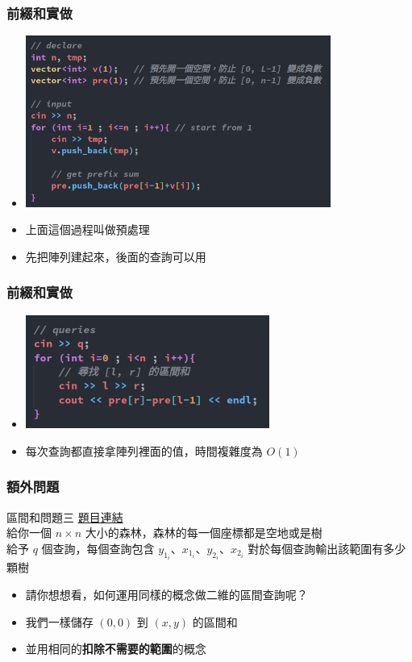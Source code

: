 \documentclass{beamer}
\begin{document}
\begin{frame}
    \frametitle{前綴和實做}
    \begin{itemize}
        \item \includegraphics[width=10.0cm]{img/img_9.png}
        \item 上面這個過程叫做預處理
        \item 先把陣列建起來，後面的查詢可以用
    \end{itemize}
\end{frame}

\begin{frame}
    \frametitle{前綴和實做}
    \begin{itemize}
        \item \includegraphics[width=8.0cm]{img/img_10.png}
        \item 每次查詢都直接拿陣列裡面的值，時間複雜度為 $O(1)$
    \end{itemize}
\end{frame}

\begin{frame}
    \frametitle{額外問題}
    \begin{block}{區間和問題三}
        \href{https://cses.fi/problemset/task/1652}{題目連結}\\
        給你一個 $n \times n$ 大小的森林，森林的每一個座標都是空地或是樹\\
        給予 $q$ 個查詢，每個查詢包含 $y_{1_i}$、$x_{1_i}$、$y_{2_i}$、$x_{2_i}$
        對於每個查詢輸出該範圍有多少顆樹
    \end{block}
    \begin{itemize}
        \item 請你想想看，如何運用同樣的概念做二維的區間查詢呢？
        \item<2-> 我們一樣儲存 $(0, 0)$ 到 $(x, y)$ 的區間和
        \item<2-> 並用相同的\textbf{扣除不需要的範圍}的概念
    \end{itemize}
\end{frame}
\end{document}
